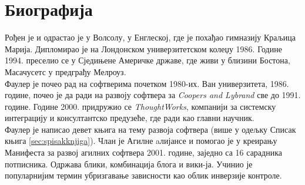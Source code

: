 \documentclass[12pt,a4paper]{article}
\begin{document}
\newpage

\section{{Биографија}}
\label{sec:biografija}
Рођен је и одрастао је у Волсолу, у Енглеској, где је похађао гимназију Краљица Марија. Дипломирао је на Лондонском универзитетском колеџу 1986. Године 1994. преселио се у Сједињене Америчке државе, где живи у близини Бостона, Масачусетс у предграђу Мелроуз\cite{sajt}.\\
Фаулер је почео рад на софтверима почетком 1980-их. Ван универзитета, 1986. године, почео је да ради на развоју софтвера за \emph{Coopers and Lybrand} све до 1991.\cite{k_3} године. Године 2000. придружио се \emph{ThoughtWorks}, компанији за системску интеграцију и консултантско предузеће\cite{sajt}, где ради као главни научник.\cite{sajt_2}\\
Фаулер је написао девет књига на тему развоја софтвера (више у одељку Списак књига \ref{sec:spisakknjiga}). Члан је Агилне aлијансе и помогао је у креирању Манифеста за развој агилних софтвера 2001. године, заједно са 16 сарадника потписника.\cite{sajt_3} Одржава блики, комбинација блога и вики-ја. Учинио је популарнијим термин убризгавање зависности као облик инверзије контроле. \cite{sajt_4, knjiga}


\newpage
\end{document}
